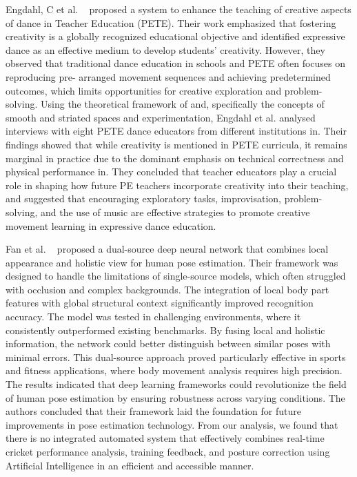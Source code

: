 Engdahl, C et al. ~\cite{engdahl2023dance} proposed a system to enhance the teaching of creative aspects of dance in Teacher Education (PETE). Their work emphasized that fostering creativity is a globally 
recognized educational objective and identified expressive dance as an effective medium to 
develop students’ creativity. However, they observed that traditional dance education in 
schools and PETE often focuses on reproducing pre- arranged movement sequences and 
achieving predetermined outcomes, which limits opportunities for creative exploration and 
problem-solving. Using the theoretical framework of and, specifically the concepts of smooth 
and striated spaces and experimentation, Engdahl et al. analysed interviews with eight PETE 
dance educators from different institutions in. Their findings showed that while creativity is 
mentioned in PETE curricula, it remains marginal in practice due to the dominant emphasis on 
technical correctness and physical performance in. They concluded that teacher educators play 
a crucial role in shaping how future PE teachers incorporate creativity into their teaching, and 
suggested that encouraging exploratory tasks, improvisation, problem-solving, and the use of 
music are effective strategies to promote creative movement learning in expressive dance 
education.

Fan et al. ~\cite{fan2015pose}  proposed a dual-source deep neural network that combines local appearance and holistic view for human pose estimation. Their framework was designed to handle the 
limitations of single-source models, which often struggled with occlusion and complex 
backgrounds. The integration of local body part features with global structural context 
significantly improved recognition accuracy. The model was tested in challenging 
environments, where it consistently outperformed existing benchmarks. By fusing local and 
holistic information, the network could better distinguish between similar poses with minimal 
errors. This dual-source approach proved particularly effective in sports and fitness 
applications, where body movement analysis requires high precision. The results indicated that 
deep learning frameworks could revolutionize the field of human pose estimation by ensuring 
robustness across varying conditions. The authors concluded that their framework laid the 
foundation for future improvements in pose estimation technology.
From our analysis, we found that there is no integrated automated system that effectively 
combines real-time cricket performance analysis, training feedback, and posture correction 
using Artificial Intelligence in an efficient and accessible manner.

